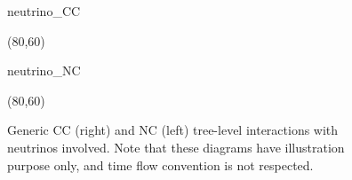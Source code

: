 \begin{figure}
	\centering
	\medskip
	\begin{fmffile}{neutrino_CC}
		\begin{fmfgraph*}(80,60)
		\end{fmfgraph*}
	\end{fmffile}
	\qquad
	\raisebox{2.5em}{,}
	\qquad
	\begin{fmffile}{neutrino_NC}
		\begin{fmfgraph*}(80,60)
		\end{fmfgraph*}
	\end{fmffile}
	\bigskip
	\caption[Generic CC and NC tree-level weak interactions]%
	{Generic CC (right) and NC (left) tree-level interactions with neutrinos involved.
	Note that these diagrams have illustration purpose only, and time flow convention is not respected. }
	\label{fig:neutrino_tree}
\end{figure}

